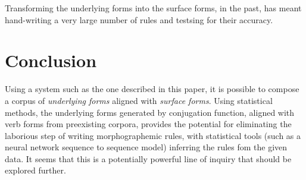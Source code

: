 \documentclass[12pt]{article}
\begin{document}
Transforming the underlying forms into the surface forms, in the past, has
meant hand-writing a very large number of rules and testsing for their
accuracy. 

\section{Conclusion}

Using a system such as the one described in this paper, it is possible to
compose a corpus of \textit{underlying forms} aligned with \textit{surface forms}.
Using statistical methods, the underlying forms generated by conjugation function,
aligned with verb forms from preexisting corpora, provides the potential for
eliminating the laborious step of writing morphographemic rules, with statistical
tools (such as a neural network sequence to sequence model) inferring the rules fom
the given data. It seems that this is a potentially powerful line of inquiry that
should be explored further.


\end{document}
